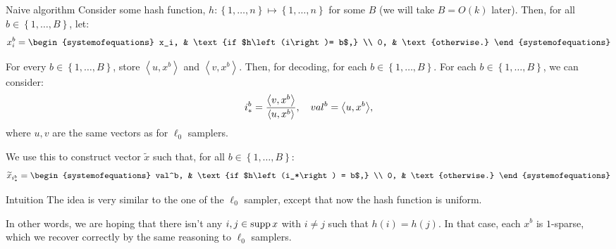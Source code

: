 \documentclass[a4paper]{article}
\begin{document}
\begin{parag}{Naive algorithm}
    Consider some hash function, $h : \left\{1, \ldots, n\right\} \mapsto \left\{1, \ldots, n\right\}$ for some $B$ (we will take $B = O\left(k\right)$ later). Then, for all $b \in \left\{1, \ldots, B\right\}$, let: 
    \[x_i^b = \begin{systemofequations} x_i, & \text{if $h\left(i\right)= b$,} \\ 0, & \text{otherwise.} \end{systemofequations}\]
    
    For every $b \in \left\{1, \ldots, B\right\}$, store $\left\langle u, x^b \right\rangle$ and $\left\langle v, x^b \right\rangle$. Then, for decoding, for each $b \in \left\{1, \ldots, B\right\}$. For each $b \in \left\{1, \ldots, B\right\}$, we can consider: 
    \[i_*^{b} = \frac{\left\langle v, x^b \right\rangle}{\left\langle u, x^b \right\rangle}, \mathspace val^b = \left\langle u, x^b \right\rangle,\]
    where $u, v$ are the same vectors as for $\ell_0$ samplers.

    We use this to construct vector $\widetilde{x}$ such that, for all $b \in \left\{1, \ldots, B\right\}$:
    \[\widetilde{x}_{i_*^b} = \begin{systemofequations} val^b, & \text{if $h\left(i_*\right) = b$,} \\ 0, & \text{otherwise.} \end{systemofequations}\]

    \begin{subparag}{Intuition}
        The idea is very similar to the one of the $\ell_0$ sampler, except that now the hash function is uniform.

        In other words, we are hoping that there isn't any $i, j \in \operatorname{supp} x$ with $i \neq j$ such that $h\left(i\right) = h\left(j\right)$. In that case, each $x^b$ is $1$-sparse, which we recover correctly by the same reasoning to $\ell_0$ samplers.
    \end{subparag}
\end{parag}
\end{document}
